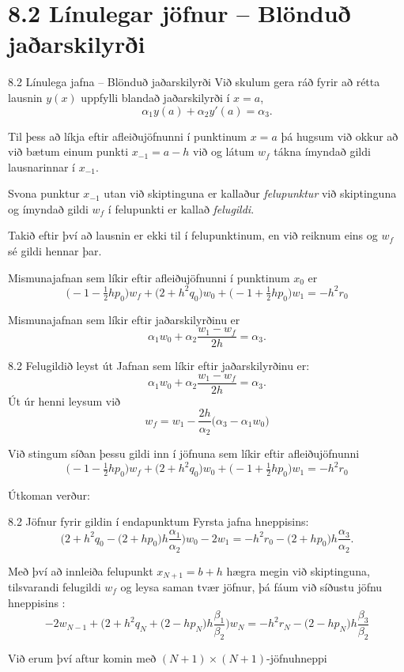 \section*{8.2 Línulegar jöfnur -- Blönduð jaðarskilyrði}
\begin{frame}{8.2 Línulega jafna -- Blönduð jaðarskilyrði} 
Við skulum gera ráð fyrir að rétta lausnin $y(x)$ uppfylli blandað
jaðarskilyrði í $x=a$, 
$$
\alpha_1y(a)+\alpha_2 y'(a)=\alpha_3.
$$

\pause
Til þess að líkja eftir afleiðujöfnunni í punktinum $x=a$ þá hugsum
við okkur að við bætum einum punkti $x_{-1}=a-h$ við og látum 
$w_f$ tákna ímyndað gildi lausnarinnar í $x_{-1}$.  

\pause
\smallskip
Svona punktur $x_{-1}$ utan við skiptinguna er kallaður 
{\it felupunktur} við skiptinguna og ímyndað gildi $w_f$ í 
felupunkti er kallað  {\it felugildi}.  

\smallskip
Takið eftir því að lausnin er ekki til í felupunktinum, en við reiknum
eins og $w_f$ sé gildi hennar þar. 

\pause
\smallskip
Mismunajafnan sem líkir eftir afleiðujöfnunni í punktinum $x_0$  er 
$$
\big(-1-\tfrac 12 hp_0\big)w_f+\big(2+h^2 q_0\big)w_0
+\big(-1+\tfrac 12 hp_0\big)w_1=-h^2r_0
$$

\pause
Mismunajafnan sem líkir eftir jaðarskilyrðinu er
$$
\alpha_1w_0+\alpha_2 \dfrac{w_1-w_f}{2h}=\alpha_3.
$$
\end{frame}


\begin{frame}{8.2 Felugildið leyst út} 
Jafnan sem líkir eftir jaðarskilyrðinu er:
$$
\alpha_1w_0+\alpha_2 \dfrac{w_1-w_f}{2h}=\alpha_3.
$$
Út úr henni leysum við
$$
w_f=w_1-\dfrac{2h}{\alpha_2}\big(\alpha_3-\alpha_1w_0\big)
$$

\pause
Við stingum síðan þessu gildi inn í jöfnuna sem líkir eftir
afleiðujöfnunni 
$$
\big(-1-\tfrac 12 hp_0\big)w_f+\big(2+h^2 q_0\big)w_0
+\big(-1+\tfrac 12 hp_0\big)w_1=-h^2r_0
$$

\pause
Útkoman verður:
\end{frame}


\begin{frame}{8.2 Jöfnur fyrir gildin í endapunktum} 
Fyrsta jafna hneppisins:
$$
\bigg(2+h^2q_0-\big(2+hp_0\big)h\dfrac{\alpha_1}{\alpha_2}\bigg)w_0
-2w_1=-h^2r_0-\big(2+hp_0\big)h\dfrac{\alpha_3}{\alpha_2}.
$$

\pause
\smallskip
Með því að innleiða felupunkt  $x_{N+1}=b+h$ hægra megin við 
skiptinguna, tilsvarandi
felugildi $w_f$ og leysa saman tvær jöfnur, þá fáum við síðustu jöfnu
hneppisins :
$$
-2w_{N-1}
+\bigg(2+h^2q_N+\big(2-hp_N\big)h\dfrac{\beta_1}{\beta_2}\bigg)w_N
=-h^2r_N-\big(2-hp_N\big)h\dfrac{\beta_3}{\beta_2}
$$

\pause
\smallskip
Við erum því aftur komin með $(N+1)\times (N+1)$-jöfnuhneppi
\end{frame}


